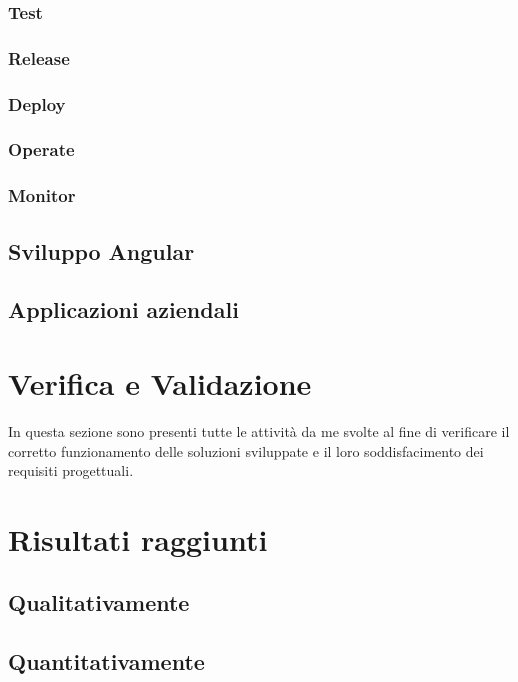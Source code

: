\subsubsection*{Test}


\subsubsection*{Release}


\subsubsection*{Deploy}


\subsubsection*{Operate}


\subsubsection*{Monitor}


\subsection{Sviluppo Angular}


\subsection{Applicazioni aziendali}




\section{Verifica e Validazione}
In questa sezione sono presenti tutte le attività da me svolte al fine di verificare il corretto funzionamento delle soluzioni sviluppate e il loro soddisfacimento dei requisiti progettuali.

\section{Risultati raggiunti}
\subsection{Qualitativamente}
%

\subsection{Quantitativamente}
%
